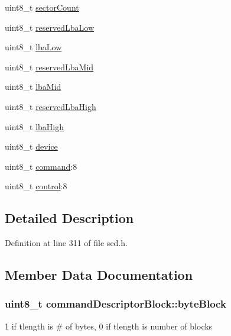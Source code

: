 \begin{DoxyCompactItemize}
uint8\+\_\+t \hyperlink{structcommandDescriptorBlock_a2e0f28faecba0a67ee5349cad5f011e9}{sector\+Count}
\item 
uint8\+\_\+t \hyperlink{structcommandDescriptorBlock_a4a6bcc946c72cd6c5aa8060fc2521010}{reserved\+Lba\+Low}
\item 
uint8\+\_\+t \hyperlink{structcommandDescriptorBlock_a43d0f9e75b22b331a36355ca2572be62}{lba\+Low}
\item 
uint8\+\_\+t \hyperlink{structcommandDescriptorBlock_a8d556f9d126816a3a06e2422630a43f4}{reserved\+Lba\+Mid}
\item 
uint8\+\_\+t \hyperlink{structcommandDescriptorBlock_a9bb5feca3b443efb128ceeada152a7d4}{lba\+Mid}
\item 
uint8\+\_\+t \hyperlink{structcommandDescriptorBlock_a1703f9519bff3df0efa2c19b2896244f}{reserved\+Lba\+High}
\item 
uint8\+\_\+t \hyperlink{structcommandDescriptorBlock_aa58b2d4228c939d16a8ba54b5e4c5d8f}{lba\+High}
\item 
uint8\+\_\+t \hyperlink{structcommandDescriptorBlock_a41685417208b97377497f29759516529}{device}
\item 
uint8\+\_\+t \hyperlink{structcommandDescriptorBlock_ab3763a8225a9c677c95f6253b789ad70}{command}\+:8
\item 
uint8\+\_\+t \hyperlink{structcommandDescriptorBlock_ac8314ebf9163ee2e6682ed3e02f4edd8}{control}\+:8
\end{DoxyCompactItemize}


\subsection{Detailed Description}


Definition at line 311 of file sed.\+h.



\subsection{Member Data Documentation}
\hypertarget{structcommandDescriptorBlock_a5a18bdc4bc910236e8aba0dec8fe88af}{
\subsubsection[{byte\+Block}]{\setlength{\rightskip}{0pt plus 5cm}uint8\+\_\+t command\+Descriptor\+Block\+::byte\+Block}}\label{structcommandDescriptorBlock_a5a18bdc4bc910236e8aba0dec8fe88af}
1 if tlength is \# of bytes, 0 if tlength is number of blocks 

